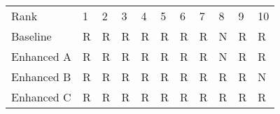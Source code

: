 \begin{tabular}{lllllllllll}
Rank & 1 & 2 & 3 & 4 & 5 & 6 & 7 & 8 & 9 & 10 \\
Baseline & R & R & R & R & R & R & R & N & R & R \\
Enhanced A & R & R & R & R & R & R & R & N & R & R \\
Enhanced B & R & R & R & R & R & R & R & R & R & N \\
Enhanced C & R & R & R & R & R & R & R & R & R & R \\
\end{tabular}
